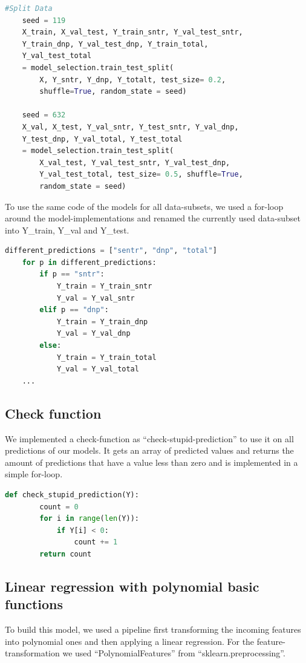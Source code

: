\documentclass[12pt,a4paper]{scrartcl}		%
\begin{document}
\begin{lstlisting}[language=Python]
    #Split Data
    seed = 119
    X_train, X_val_test, Y_train_sntr, Y_val_test_sntr, 
    Y_train_dnp, Y_val_test_dnp, Y_train_total, 
    Y_val_test_total
    = model_selection.train_test_split(
        X, Y_sntr, Y_dnp, Y_totalt, test_size= 0.2, 
        shuffle=True, random_state = seed)

    seed = 632
    X_val, X_test, Y_val_sntr, Y_test_sntr, Y_val_dnp, 
    Y_test_dnp, Y_val_total, Y_test_total 
    = model_selection.train_test_split(
        X_val_test, Y_val_test_sntr, Y_val_test_dnp, 
        Y_val_test_total, test_size= 0.5, shuffle=True,
        random_state = seed)
\end{lstlisting}

To use the same code of the models for all data-subsets, we used a for-loop around the model-implementations and renamed the 
currently used data-subset into Y\_train, Y\_val and Y\_test.

\begin{lstlisting}[language=Python]
    different_predictions = ["sentr", "dnp", "total"]
    for p in different_predictions:
        if p == "sntr":
            Y_train = Y_train_sntr
            Y_val = Y_val_sntr
        elif p == "dnp":
            Y_train = Y_train_dnp
            Y_val = Y_val_dnp
        else:
            Y_train = Y_train_total
            Y_val = Y_val_total
    ...
\end{lstlisting}

\subsection{Check function}
We implemented a check-function as “check-stupid-prediction” to use it on all predictions of our models. It gets an array of 
predicted values and returns the amount of predictions that have a value less than zero and is implemented in a simple for-loop.

\begin{lstlisting}[language=Python]
    def check_stupid_prediction(Y):
        count = 0
        for i in range(len(Y)):
            if Y[i] < 0:
                count += 1
        return count
\end{lstlisting}

\subsection{Linear regression with polynomial basic functions}
To build this model, we used a pipeline first transforming the incoming features into polynomial ones and then applying a linear 
regression. For the feature-transformation we used “PolynomialFeatures” from “sklearn.preprocessing”.
\end{document}
